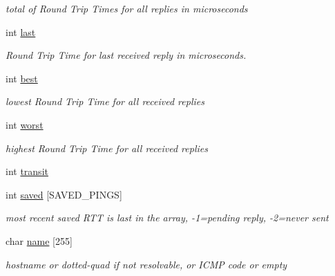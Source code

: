 \begin{CompactItemize}
\begin{CompactList}\small\item\em total of Round Trip Times for all replies in microseconds \item\end{CompactList}\item 
\hypertarget{structs__nethost_7b95d9c7c59322b84a96ca2a48cda2b8}{
int \hyperlink{structs__nethost_7b95d9c7c59322b84a96ca2a48cda2b8}{last}}
\label{structs__nethost_7b95d9c7c59322b84a96ca2a48cda2b8}

\begin{CompactList}\small\item\em Round Trip Time for last received reply in microseconds. \item\end{CompactList}\item 
\hypertarget{structs__nethost_5700c30e32a122a6d033eeba9c807a37}{
int \hyperlink{structs__nethost_5700c30e32a122a6d033eeba9c807a37}{best}}
\label{structs__nethost_5700c30e32a122a6d033eeba9c807a37}

\begin{CompactList}\small\item\em lowest Round Trip Time for all received replies \item\end{CompactList}\item 
\hypertarget{structs__nethost_434a107e315ea1affe2cf00beba8a2b4}{
int \hyperlink{structs__nethost_434a107e315ea1affe2cf00beba8a2b4}{worst}}
\label{structs__nethost_434a107e315ea1affe2cf00beba8a2b4}

\begin{CompactList}\small\item\em highest Round Trip Time for all received replies \item\end{CompactList}\item 
int \hyperlink{structs__nethost_cedbbf6771d0cf034f5a31cccc7e41ec}{transit}
\item 
\hypertarget{structs__nethost_5562884958a8e87c3f8e15ff673df81c}{
int \hyperlink{structs__nethost_5562884958a8e87c3f8e15ff673df81c}{saved} \mbox{[}SAVED\_\-PINGS\mbox{]}}
\label{structs__nethost_5562884958a8e87c3f8e15ff673df81c}

\begin{CompactList}\small\item\em most recent saved RTT is last in the array, -1=pending reply, -2=never sent \item\end{CompactList}\item 
\hypertarget{structs__nethost_8106e956c21d1741e01b7c5d988cdf2b}{
char \hyperlink{structs__nethost_8106e956c21d1741e01b7c5d988cdf2b}{name} \mbox{[}255\mbox{]}}
\label{structs__nethost_8106e956c21d1741e01b7c5d988cdf2b}

\begin{CompactList}\small\item\em hostname or dotted-quad if not resolvable, or ICMP code or empty \item\end{CompactList}\end{CompactItemize}


